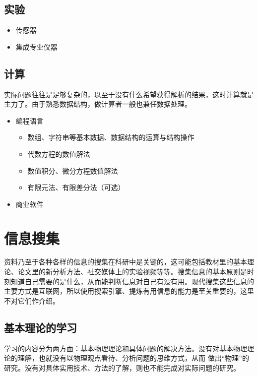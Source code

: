 \documentclass[a4paper,10pt,english]{sphinxmanual}
\begin{document}
\section{实验}
\label{\detokenize{4. ChooseYourSkill:id5}}\begin{itemize}
\item {} 
传感器

\item {} 
集成专业仪器

\end{itemize}


\section{计算}
\label{\detokenize{4. ChooseYourSkill:id6}}
实际问题往往是足够复杂的，以至于没有什么希望获得解析的结果，这时计算就是主力了。由于熟悉数据结构，做计算者一般也兼任数据处理。
\begin{itemize}
\item {} 
编程语言
\begin{itemize}
\item {} 
数组、字符串等基本数据、数据结构的运算与结构操作

\item {} 
代数方程的数值解法

\item {} 
数值积分、微分方程数值解法

\item {} 
有限元法、有限差分法（可选）

\end{itemize}

\item {} 
商业软件

\end{itemize}


\chapter{信息搜集}
\label{\detokenize{5. GetInfo:id1}}\label{\detokenize{5. GetInfo::doc}}
资料乃至于各种各样的信息的搜集在科研中是关键的，这可能包括教材里的基本理论、论文里的新分析方法、社交媒体上的实验视频等等。搜集信息的基本原则是时刻知道自己需要的是什么，从而能判断信息对自己有没有用。现代搜集这些信息的主要方式是互联网，所以使用搜索引擎、提炼有用信息的能力是至关重要的，这里不对它们作介绍。


\section{基本理论的学习}
\label{\detokenize{5. GetInfo:id2}}
学习的内容分为两方面：基本物理理论和具体问题的解决方法。没有对基本物理理论的理解，也就没有以物理观点看待、分析问题的思维方式，从而  做出“物理”的研究。没有对具体实用技术、方法的了解，则也不能完成对实际问题的研究。
\end{document}
